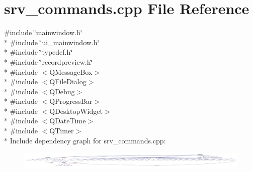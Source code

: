 \hypertarget{a00047}{\section{srv\+\_\+commands.\+cpp File Reference}
\label{a00047}
}
{\ttfamily \#include \char`\"{}mainwindow.\+h\char`\"{}}\\*
{\ttfamily \#include \char`\"{}ui\+\_\+mainwindow.\+h\char`\"{}}\\*
{\ttfamily \#include \char`\"{}typedef.\+h\char`\"{}}\\*
{\ttfamily \#include \char`\"{}recordpreview.\+h\char`\"{}}\\*
{\ttfamily \#include $<$Q\+Message\+Box$>$}\\*
{\ttfamily \#include $<$Q\+File\+Dialog$>$}\\*
{\ttfamily \#include $<$Q\+Debug$>$}\\*
{\ttfamily \#include $<$Q\+Progress\+Bar$>$}\\*
{\ttfamily \#include $<$Q\+Desktop\+Widget$>$}\\*
{\ttfamily \#include $<$Q\+Date\+Time$>$}\\*
{\ttfamily \#include $<$Q\+Timer$>$}\\*
Include dependency graph for srv\+\_\+commands.\+cpp\+:
\nopagebreak
\begin{figure}[H]
\begin{center}
\leavevmode
\includegraphics[width=350pt]{dc/d31/a00208}
\end{center}
\end{figure}
